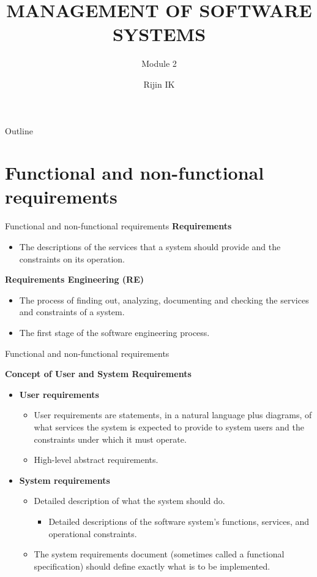 \documentclass{beamer}
\title[CST 309 M2]{MANAGEMENT OF SOFTWARE SYSTEMS}
\subtitle{Module 2}
\author{Rijin IK}
\institute[VJEC]{Assistant Professor\\Department of Computer Science and Engineering\\Vimal Jyothi Engineering College\\Chemperi}
\begin{document}
	\begin{frame}
		\titlepage
	\end{frame}
   \begin{frame}{Outline}
   \tableofcontents
   \end{frame}
\section{Functional and non-functional requirements}
\begin{frame}{Functional and non-functional requirements}
\textbf{Requirements}
\begin{itemize}
	\item The descriptions of the services that a system 
	should provide and the constraints on its operation.
\end{itemize}
\textbf{Requirements Engineering (RE)}
\begin{itemize}
	\item The process of finding out, analyzing, documenting and checking the services 
	and constraints of a system.
	\item The first stage of the software engineering process.
\end{itemize}
\end{frame}
\begin{frame}{Functional and non-functional requirements}
	
\textbf{Concept of User and System Requirements}
\begin{itemize}
	\item 	\textbf{User requirements }
	\begin{itemize}
		\item User requirements are statements, in a natural language plus diagrams, of what services the system is expected to provide to system users and the constraints under which it must operate. 
		\item High-level abstract requirements.
	\end{itemize}
	\item \textbf{System requirements}
	\begin{itemize}
		\item Detailed description of what the 
		system should do.
		\begin{itemize}
			\item Detailed descriptions of the software 
			system’s functions, services, and 
			operational constraints.
		\end{itemize}
		\item The system requirements document (sometimes called a functional specification) should define exactly what is to be implemented. 
	\end{itemize}
\end{itemize}
\end{frame}
\end{document}
